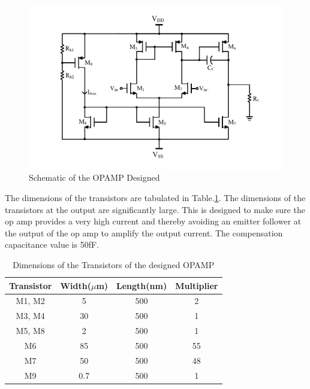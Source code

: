\begin{figure} [H]
\centering
\includegraphics[scale=1]{Figures/Schematics/OPAMP_Vbias.pdf}
\caption{Schematic of the OPAMP Designed}
\label{fig:OPAMP_Schematic}
\end{figure}

The dimensions of the transistors are tabulated in Table.\ref{tab:OPAMP_dimensions}. The dimensions of the transistors at the output are significantly large. This is designed to make sure the op amp provides a very high current and thereby avoiding an emitter follower at the output of the op amp to amplify the output current. The compensation capacitance value is 50fF.

\begin{table} [H]
\centering
\begin{tabular}{@{}cccc@{}}
\toprule
Transistor			& Width($\mu$m)		& Length(nm)		& Multiplier \\ \midrule
M1, M2				& 5					& 500				& 2			\\
M3, M4				& 30 				& 500				& 1			\\
M5, M8				& 2 				& 500				& 1			\\
M6					& 85 				& 500				& 55		\\ 
M7					& 50 				& 500				& 48		\\
M9					& 0.7				& 500				& 1			\\
\bottomrule
\end{tabular}
\caption{Dimensions of the Transistors of the designed OPAMP}
\label{tab:OPAMP_dimensions}
\end{table}

